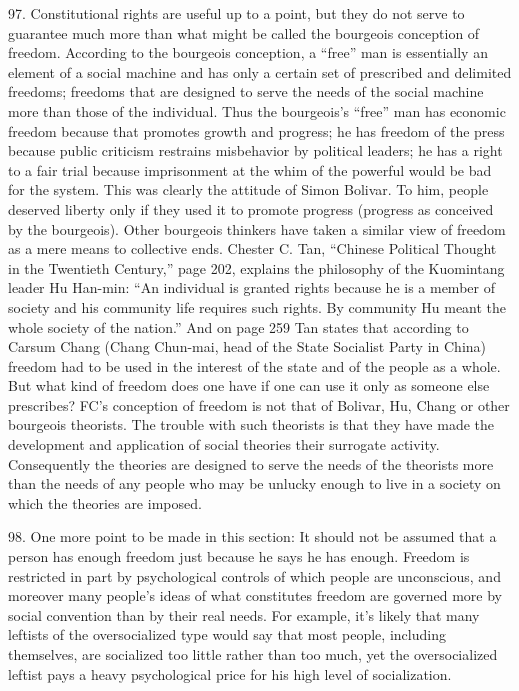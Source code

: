 \documentclass{article}
\begin{document}
97.  Constitutional rights are useful up to a point, but they do not serve to guarantee much more 
than  what  might  be  called  the  bourgeois  conception  of  freedom.   According  to  the  bourgeois  
conception, a “free” man is essentially an element of a social machine and has only a certain set 
of prescribed and delimited freedoms; freedoms that are designed to serve the needs of the social 
machine  more  than  those  of  the  individual.   Thus  the  bourgeois’s  “free”  man  has  economic  
freedom because that promotes growth and progress; he has freedom of the press because public 
criticism  restrains  misbehavior  by  political  leaders;  he  has  a  right  to  a  fair  trial  because  
imprisonment  at  the  whim  of  the  powerful  would  be  bad  for  the  system.   This  was  clearly  the  
attitude of Simon Bolivar.  To him, people deserved liberty only if they used it to promote progress 
(progress as conceived by the bourgeois).  Other bourgeois thinkers have taken a similar view of 
freedom as a mere means to collective ends.  Chester C.  Tan, “Chinese Political Thought in the 
Twentieth Century,” page 202, explains the philosophy of the  Kuomintang leader  Hu Han-min: 
“An individual is granted rights because he is a member of society and his community life requires 
such  rights.   By  community  Hu  meant  the  whole  society  of  the  nation.”  And  on  page  259  Tan  
states  that  according  to  Carsum  Chang  (Chang  Chun-mai,  head  of  the  State  Socialist  Party  in  
China) freedom had to be used in the interest of the state and of the people as a whole.  But what 
kind of freedom does one have if one can use it only as someone else prescribes? FC’s conception 
of freedom is not that of Bolivar, Hu, Chang or other bourgeois theorists.  The trouble with such 
theorists is that they have made the development and application of social theories their surrogate 
activity.  Consequently the theories are designed to serve the needs of the theorists more than the 
needs of any  people who may be unlucky  enough to live in  a society on  which the theories are 
imposed. \vspace{\baselineskip}
 
98.  One more point to be made in this section: It should not be assumed that a person has enough 
freedom  just  because  he  says  he  has  enough.   Freedom  is  restricted  in  part  by  psychological  
controls of which people are unconscious, and moreover many people’s ideas of what constitutes 
freedom are governed more by social convention than by their real needs.  For example, it’s likely 
that many leftists of the oversocialized type would say that most people, including themselves, are 
socialized too little rather than too much, yet the oversocialized leftist pays a heavy psychological 
price for his high level of socialization. 
\end{document}
